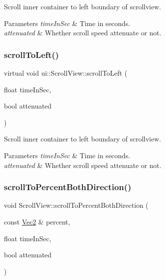 Scroll inner container to left boundary of scrollview. 
\begin{DoxyParams}{Parameters}
{\em time\+In\+Sec} & Time in seconds. \\
\hline
{\em attenuated} & Whether scroll speed attenuate or not. \\
\hline
\end{DoxyParams}
\mbox{\label{classui_1_1ScrollView_ab6635faf13dc8b9443bcffb2bffea988}} 
\subsubsection{\texorpdfstring{scroll\+To\+Left()}{scrollToLeft()}\hspace{0.1cm}{\footnotesize\ttfamily [2/2]}}
{\footnotesize\ttfamily virtual void ui\+::\+Scroll\+View\+::scroll\+To\+Left (\begin{DoxyParamCaption}\item[{float}]{time\+In\+Sec,  }\item[{bool}]{attenuated }\end{DoxyParamCaption})\hspace{0.3cm}{\ttfamily [virtual]}}

Scroll inner container to left boundary of scrollview. 
\begin{DoxyParams}{Parameters}
{\em time\+In\+Sec} & Time in seconds. \\
\hline
{\em attenuated} & Whether scroll speed attenuate or not. \\
\hline
\end{DoxyParams}
\mbox{\label{classui_1_1ScrollView_aaa0cee9e0a1c8c2c3cb43253eccfaeef}} 
\subsubsection{\texorpdfstring{scroll\+To\+Percent\+Both\+Direction()}{scrollToPercentBothDirection()}\hspace{0.1cm}{\footnotesize\ttfamily [1/2]}}
{\footnotesize\ttfamily void Scroll\+View\+::scroll\+To\+Percent\+Both\+Direction (\begin{DoxyParamCaption}\item[{const \hyperlink{classVec2}{Vec2} \&}]{percent,  }\item[{float}]{time\+In\+Sec,  }\item[{bool}]{attenuated }\end{DoxyParamCaption})\hspace{0.3cm}{\ttfamily [virtual]}}

